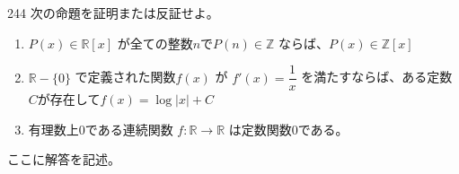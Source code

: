 \begin{thm}{244}{}{}
 次の命題を証明または反証せよ。
 \begin{enumerate}
  \item $P(x)\in\mathbb{R}[x]$ が全ての整数$n$で$P(n)\in\mathbb{Z}$ ならば、$P(x)\in\mathbb{Z}[x]$
  \item $\mathbb{R}-\{0\}$ で定義された関数$f(x)$ が $f'(x)=\dfrac{1}{x}$ を満たすならば、ある定数$C$が存在して$f(x)=\log |x|+C$
  \item 有理数上0である連続関数 $f:\mathbb{R}\rightarrow\mathbb{R}$ は定数関数0である。
 \end{enumerate}
\end{thm}

ここに解答を記述。
